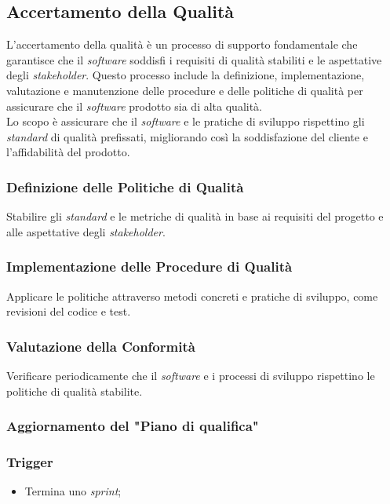 \subsection{Accertamento della Qualità}
L'accertamento della qualità è un processo di supporto fondamentale che
garantisce che il \textit{software} soddisfi i requisiti di qualità stabiliti e
le aspettative degli \textit{stakeholder}.
Questo processo include la definizione, implementazione, valutazione e
manutenzione delle procedure e delle politiche di qualità per assicurare che
il \textit{software} prodotto sia di alta qualità. \\
Lo scopo è assicurare che il \textit{software} e le pratiche di sviluppo rispettino gli
\textit{standard} di qualità prefissati, migliorando così la soddisfazione del cliente e
l'affidabilità del prodotto.

\subsubsection{Definizione delle Politiche di Qualità} 
Stabilire gli
	  \textit{standard} e le metriche di qualità in base ai requisiti del progetto e
	  alle aspettative degli \textit{stakeholder}.

\subsubsection{Implementazione delle Procedure di Qualità} 
Applicare le
	  politiche attraverso metodi concreti e pratiche di sviluppo, come
	  revisioni del codice e test.

\subsubsection{Valutazione della Conformità} 
Verificare periodicamente che
	  il \textit{software} e i processi di sviluppo rispettino le politiche
	  di qualità stabilite.





\subsubsection{Aggiornamento del "Piano di qualifica"}
\label{aggiornare-pdq}

\subsubsection*{Trigger}
\begin{itemize}
	\item Termina uno \textit{sprint};
\end{itemize}

